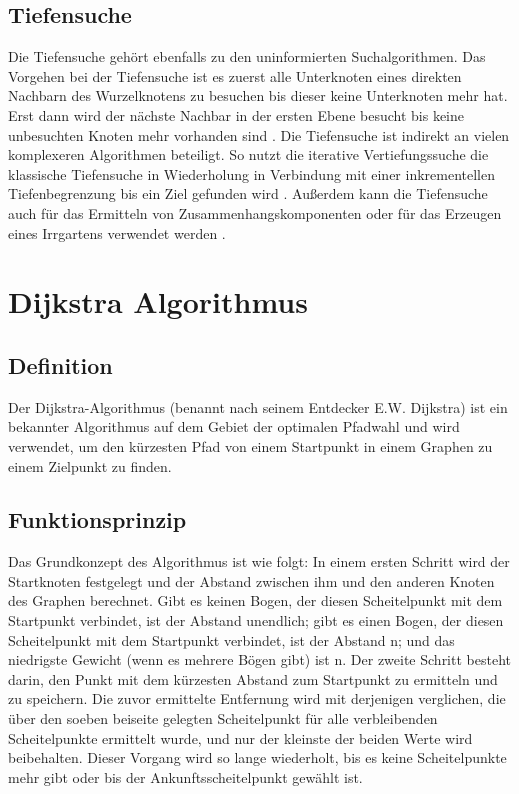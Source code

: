 \subsection{Tiefensuche}
\label{Tiefensuche}
Die Tiefensuche gehört ebenfalls zu den uninformierten Suchalgorithmen.
Das Vorgehen bei der Tiefensuche ist es zuerst alle Unterknoten eines direkten Nachbarn des Wurzelknotens zu besuchen bis dieser keine Unterknoten mehr hat.
Erst dann wird der nächste Nachbar in der ersten Ebene besucht bis keine unbesuchten Knoten mehr vorhanden sind \cite[85,86]{Russell:10}. Die Tiefensuche ist indirekt an vielen 
komplexeren Algorithmen beteiligt. 
So nutzt die iterative Vertiefungssuche die klassische Tiefensuche in Wiederholung in Verbindung mit einer inkrementellen Tiefenbegrenzung bis ein Ziel gefunden wird \cite[108,109]{Russell:10}.
Außerdem kann die Tiefensuche auch für das Ermitteln von Zusammenhangskomponenten
oder für das Erzeugen eines Irrgartens verwendet werden \cite[85,86]{Russell:10}.

\section{Dijkstra Algorithmus}
\label{Dijkstra Algorithmus}
\subsection{Definition}

Der Dijkstra-Algorithmus (benannt nach seinem Entdecker E.W. Dijkstra) ist ein bekannter Algorithmus auf dem Gebiet der optimalen Pfadwahl und wird verwendet, um den kürzesten Pfad von einem Startpunkt in einem Graphen zu einem Zielpunkt zu finden\cite{Javaid2019}.

\subsection{Funktionsprinzip}

Das Grundkonzept des Algorithmus ist wie folgt:
\newline
\newline
In einem ersten Schritt wird der Startknoten festgelegt und der Abstand zwischen ihm und den anderen Knoten des Graphen berechnet. Gibt es keinen Bogen, der diesen Scheitelpunkt mit dem Startpunkt verbindet, ist der Abstand unendlich; gibt es einen Bogen, der diesen Scheitelpunkt mit dem Startpunkt verbindet, ist der Abstand n; und das niedrigste Gewicht (wenn es mehrere Bögen gibt) ist n.
\newline
\newline
Der zweite Schritt besteht darin, den Punkt mit dem kürzesten Abstand zum Startpunkt zu ermitteln und zu speichern. Die zuvor ermittelte Entfernung wird mit derjenigen verglichen, die über den soeben beiseite gelegten Scheitelpunkt für alle verbleibenden Scheitelpunkte ermittelt wurde, und nur der kleinste der beiden Werte wird beibehalten. Dieser Vorgang wird so lange wiederholt, bis es keine Scheitelpunkte mehr gibt oder bis der Ankunftsscheitelpunkt gewählt ist\cite{Zhou:19}.

